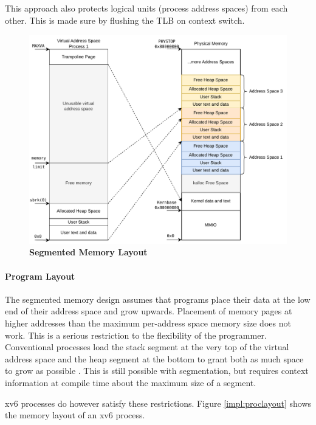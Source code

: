 This approach also protects logical units (process address spaces) from each other. This is made sure
by flushing the TLB on context switch.



\begin{figure}[ht!]
    \centering
    \includegraphics[]{figures/segmented_layout.pdf}
    \caption[Segmented Memory Layout]{\textbf{Segmented Memory Layout}}
    \label{fig:theory:segLayout}
\end{figure}

\paragraph{Program Layout} The segmented memory design assumes that programs place their data at the low end of their address
space and grow upwards.
Placement of memory pages at higher addresses than the maximum per-address space memory size does not work. This is a serious restriction to the flexibility of the programmer. Conventional processes load the stack segment at the very top of the virtual address space and the heap segment at the bottom to grant both as much space to grow as possible \cite{tanenbaumOS}. This is still possible with segmentation, but requires context information at compile time about the maximum size of a segment.

xv6 processes do however satisfy these restrictions. Figure \ref{impl:proclayout} shows the memory layout
of an xv6 process.

